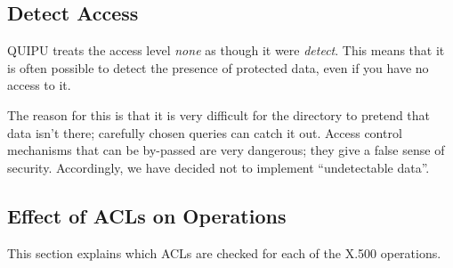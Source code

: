 \subsection{Detect Access}

QUIPU treats the access level {\em none} as though it were {\em detect}.
This means that it is often possible to detect the presence of protected data,
even if you have no access to it.

The reason for this is that it is very difficult for the directory to
pretend that data isn't there; carefully chosen queries can catch it out.
Access control mechanisms that can be by-passed are very dangerous; they
give a false sense of security. Accordingly, we have decided not to
implement ``undetectable data''.

\subsection{Effect of ACLs on Operations}

This section explains which ACLs are checked for each of the X.500 operations.

